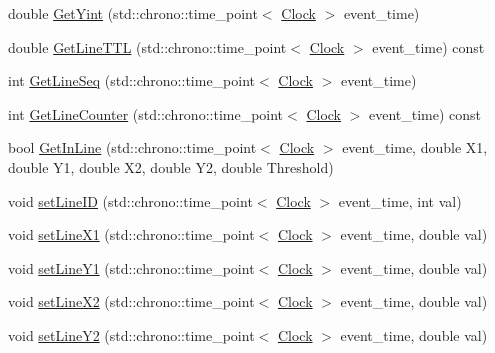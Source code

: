 \begin{DoxyCompactItemize}
double \hyperlink{class_line_a5319d68ecb254ff61e2a46d5928aec93}{Get\+Yint} (std\+::chrono\+::time\+\_\+point$<$ \hyperlink{universe_8h_a0ef8d951d1ca5ab3cfaf7ab4c7a6fd80}{Clock} $>$ event\+\_\+time)
\item 
double \hyperlink{class_line_a5b9419146093908e5c7d740ac384fe39}{Get\+Line\+T\+TL} (std\+::chrono\+::time\+\_\+point$<$ \hyperlink{universe_8h_a0ef8d951d1ca5ab3cfaf7ab4c7a6fd80}{Clock} $>$ event\+\_\+time) const
\item 
int \hyperlink{class_line_a8764cb987ec4af839f30411dc47a835a}{Get\+Line\+Seq} (std\+::chrono\+::time\+\_\+point$<$ \hyperlink{universe_8h_a0ef8d951d1ca5ab3cfaf7ab4c7a6fd80}{Clock} $>$ event\+\_\+time)
\item 
int \hyperlink{class_line_ac13c6405cfd2a586633b5a5eece05fff}{Get\+Line\+Counter} (std\+::chrono\+::time\+\_\+point$<$ \hyperlink{universe_8h_a0ef8d951d1ca5ab3cfaf7ab4c7a6fd80}{Clock} $>$ event\+\_\+time) const
\item 
bool \hyperlink{class_line_a4c9d571599ebc5e9b6090b54a338fbde}{Get\+In\+Line} (std\+::chrono\+::time\+\_\+point$<$ \hyperlink{universe_8h_a0ef8d951d1ca5ab3cfaf7ab4c7a6fd80}{Clock} $>$ event\+\_\+time, double X1, double Y1, double X2, double Y2, double Threshold)
\item 
void \hyperlink{class_line_aaa634bf320b9d1c4becb4083cd8324d4}{set\+Line\+ID} (std\+::chrono\+::time\+\_\+point$<$ \hyperlink{universe_8h_a0ef8d951d1ca5ab3cfaf7ab4c7a6fd80}{Clock} $>$ event\+\_\+time, int val)
\item 
void \hyperlink{class_line_ab8df9f66bffc86994db3150a4eb8ed29}{set\+Line\+X1} (std\+::chrono\+::time\+\_\+point$<$ \hyperlink{universe_8h_a0ef8d951d1ca5ab3cfaf7ab4c7a6fd80}{Clock} $>$ event\+\_\+time, double val)
\item 
void \hyperlink{class_line_af236c5ddb0d125b388621b3597266a95}{set\+Line\+Y1} (std\+::chrono\+::time\+\_\+point$<$ \hyperlink{universe_8h_a0ef8d951d1ca5ab3cfaf7ab4c7a6fd80}{Clock} $>$ event\+\_\+time, double val)
\item 
void \hyperlink{class_line_ade959bc4d4f69bb421ed4f69c0d77fb7}{set\+Line\+X2} (std\+::chrono\+::time\+\_\+point$<$ \hyperlink{universe_8h_a0ef8d951d1ca5ab3cfaf7ab4c7a6fd80}{Clock} $>$ event\+\_\+time, double val)
\item 
void \hyperlink{class_line_a671f64c437fe1bef798476d93c675099}{set\+Line\+Y2} (std\+::chrono\+::time\+\_\+point$<$ \hyperlink{universe_8h_a0ef8d951d1ca5ab3cfaf7ab4c7a6fd80}{Clock} $>$ event\+\_\+time, double val)
\item 

\end{DoxyCompactItemize}

